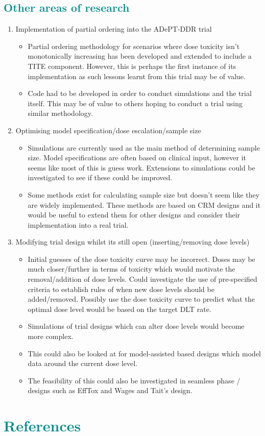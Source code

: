 \documentclass[a4paper, 11pt]{article} %
\newcommand{\RN}[1]{
	\textup{\uppercase\expandafter{\romannumeral#1}}} %
\begin{document}
\subsection{\textcolor{DarkCyan}{Other areas of research}}
\begin{enumerate}
	\item Implementation of partial ordering into the ADePT-DDR trial
		\begin{itemize}
			\item Partial ordering methodology for scenarios where dose toxicity isn't monotonically increasing has been developed and extended to include a TITE component. However, this is perhaps the first instance of its implementation as such lessons learnt from this trial may be of value. 
			\item Code had to be developed in order to conduct simulations and the trial itself. This may be of value to others hoping to conduct a trial using similar methodology. 
		\end{itemize}
	\item Optimising model specification/dose escalation/sample size
		\begin{itemize}
			\item Simulations are currently used as the main method of determining sample size. Model specifications are often based on clinical input, however it seems like most of this is guess work. Extensions to simulations could be investigated to see if these could be improved.
			\item Some methods exist for calculating sample size but doesn't seem like they are widely implemented. These methods are based on CRM designs and it would be useful to extend them for other designs and consider their implementation into a real trial.    
		\end{itemize}
	\item Modifying trial design whilst its still open (inserting/removing dose levels)
		\begin{itemize}
			\item Initial guesses of the dose toxicity curve may be incorrect. Doses may be much closer/further in terms of toxicity which would motivate the removal/addition of dose levels. Could investigate the use of pre-specified criteria to establish rules of when new dose levels should be added/removed. Possibly use the dose toxicity curve to predict what the optimal dose level would be based on the target DLT rate. 
			\item Simulations of trial designs which can alter dose levels would become more complex.
			\item This could also be looked at for model-assisted based designs which model data around the current dose level. 
			\item The feasibility of this could also be investigated in seamless phase \RN{1}/\RN{2} designs such as EffTox and Wages and Tait's design. 
		\end{itemize} 
\end{enumerate}





\newpage

\section{\textcolor{DarkCyan}{References}}


\end{document}

